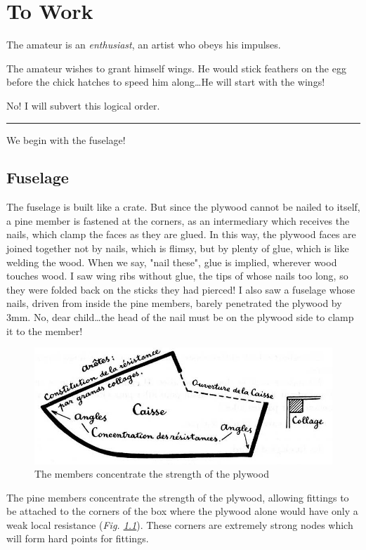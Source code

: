 \documentclass{book}
\newcommand*\sectline{
  \vspace{5pt}
  \begin{center}
    \rule{0.5\linewidth}{\linethickness}
  \end{center}
  \vspace{5pt}
}
\begin{document}
\chapter{To Work}

The amateur is an \textit{enthusiast}, an artist who obeys his
impulses.

The amateur wishes to grant himself wings. He would stick feathers on
the egg before the chick hatches to speed him along\ldots He will
start with the wings!

No!  I will subvert this logical order.

\sectline

We begin with the fuselage!

\section{Fuselage}

The fuselage is built like a crate. But since the plywood cannot be
nailed to itself, a pine member is fastened at the corners, as an
intermediary which receives the nails, which clamp the faces as they
are glued. In this way, the plywood faces are joined together not by
nails, which is flimsy, but by plenty of glue, which is like welding
the wood. When we say, "nail these", glue is implied, wherever wood
touches wood.  I saw wing ribs without glue, the tips of whose nails
too long, so they were folded back on the sticks they had pierced! I
also saw a fuselage whose nails, driven from inside the pine members,
barely penetrated the plywood by 3mm.  No, dear child\ldots the head
of the nail must be on the plywood side to clamp it to the member!

\begin{figure}
  \includegraphics[width=\linewidth]{fig-15.jpg}
  \caption{The members concentrate the strength of the plywood}
  \label{fig:fifteen}
\end{figure}

The pine members concentrate the strength of the plywood, allowing
fittings to be attached to the corners of the box where the plywood
alone would have only a weak local resistance
(\textit{Fig. \ref{fig:fifteen}}). These corners are extremely strong nodes which
will form hard points for fittings.
\end{document}
